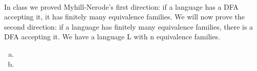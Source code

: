 \documentclass{article}
\begin{document}
 \\
In class we proved Myhill-Nerode's first direction: if a language has a DFA
accepting it, it has finitely many equivalence families.
We will now prove the second direction: if a language has finitely many
equivalence families, there is a DFA accepting it.
We have a language L with n equivalence families.

\begin{enumerate}[(a)]
      \item 

      \item 
\end{enumerate}
\end{document}
